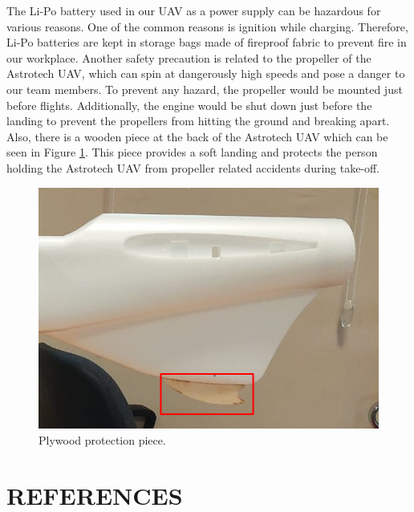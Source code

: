 \documentclass[12pt]{article}
\begin{document}
 \justify
The Li-Po battery used in our UAV as a power supply can be hazardous for various reasons. One of the common reasons is ignition while charging. Therefore, Li-Po batteries are kept in storage bags made of fireproof fabric to prevent fire in our workplace. Another safety precaution is related to the propeller of the Astrotech UAV, which can spin at dangerously high speeds and pose a danger to our team members. To prevent any hazard, the propeller would be mounted just before flights. Additionally, the engine would be shut down just before the landing to prevent the propellers from hitting the ground and breaking apart. Also, there is a wooden piece at the back of the Astrotech UAV which can be seen in Figure \ref{fig:piece}. This piece provides a soft landing and protects the person holding the Astrotech UAV from propeller related accidents during take-off.

\begin{figure}[ht]
 	\centering
 	\includegraphics[width = .5\linewidth]{safety.png}
 	\caption{Plywood protection piece.}
 	\label{fig:piece}
 \end{figure}
\FloatBarrier
\clearpage 
\section{REFERENCES}

\singlespacing
 

\end{document}
